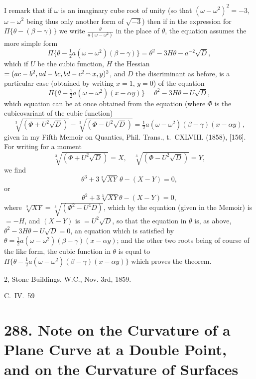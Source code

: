 \documentclass[11pt,a4paper]{article}
\theoremstyle{plain}
\begin{document}
I remark that if $\omega$ is an imaginary cube root of unity (so that $(\omega - \omega^2)^2 = -3$, $\omega - \omega^2$ being thus only another form of $\sqrt{-3}$) then if in the expression for $\Pi\{\theta - (\beta - \gamma)\}$ we write $\frac{\theta}{a(\omega - \omega^2)}$ in the place of $\theta$, the equation assumes the more simple form
\[
\Pi\{\theta - \tfrac{1}{2}a(\omega - \omega^2)(\beta - \gamma)\} = \theta^2 - 3H\theta - a^{-2}\sqrt{D},
\]
which if $U$ be the cubic function, $H$ the Hessian $= (ac - b^2, ad - bc, bd - c^2 \mathbin{\vcenter{\hbox{$\scriptstyle\!\frown$}}} x, y)^2$, and $D$ the discriminant as before, is a particular case (obtained by writing $x = 1$, $y = 0$) of the equation
\[
\Pi\{\theta - \tfrac{1}{2}a(\omega - \omega^2)(x - \alpha y)\} = \theta^2 - 3H\theta - U\sqrt{D},
\]
which equation can be at once obtained from the equation (where $\Phi$ is the cubicovariant of the cubic function)
\[
\sqrt[3]{(\Phi + U^2\sqrt{D})} - \sqrt[3]{(\Phi - U^2\sqrt{D})} = \tfrac{1}{2}a(\omega - \omega^2)(\beta - \gamma)(x - \alpha y),
\]
given in my Fifth Memoir on Quantics, Phil. Trans., t.~CXLVIII. (1858), [156]. For writing for a moment
\[
\sqrt[3]{(\Phi + U^2\sqrt{D})} = X,\quad \sqrt[3]{(\Phi - U^2\sqrt{D})} = Y,
\]
we find
\[
\theta^3 + 3\sqrt[3]{XY}\,\theta - (X - Y) = 0,
\]
or
\[
\theta^2 + 3\sqrt[3]{XY}\theta - (X - Y) = 0,
\]
where $\sqrt[3]{XY} = \sqrt[3]{(\Phi^2 - U^4D)}$, which by the equation (given in the Memoir) is $= -H$, and $(X - Y)$ is $= U^2\sqrt{D}$, so that the equation in $\theta$ is, as above, $\theta^2 - 3H\theta - U\sqrt{D} = 0$, an equation which is satisfied by $\theta = \tfrac{1}{2}a(\omega - \omega^2)(\beta - \gamma)(x - \alpha y)$; and the other two roots being of course of the like form, the cubic function in $\theta$ is equal to $\Pi\{\theta - \tfrac{1}{2}a(\omega - \omega^2)(\beta - \gamma)(x - \alpha y)\}$ which proves the theorem.

\hfill 2, Stone Buildings, W.C., Nov. 3rd, 1859.

\hfill C.~IV.\ 59



\newpage
\section*{288. Note on the Curvature of a Plane Curve at a Double Point, and on the Curvature of Surfaces}
\label{sec:288}
\end{document}
